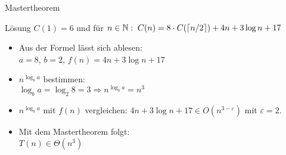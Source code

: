 \begin{frame}{Mastertheorem}
    
    \begin{block}{Lösung}
        $C(1)=6$ und für $n \in \mathbb{N} : \; C(n) = 8 \cdot C(\lceil n / 2 \rceil) + 4n + 3 \log n + 17$
        \begin{itemize}
            \item Aus der Formel lässt sich ablesen:\\
                $a=8$, $b=2$, $f(n)= 4n + 3 \log n + 17$
            \item $n^{\log_b a}$ bestimmen:\\
                $\log_b a = \log_2 8 = 3 \Rightarrow n^{\log_b a} = n^3$
            \item $n^{\log_b a}$ mit $f(n)$ vergleichen: $4n + 3 \log n + 17 \in O(n^{3-\varepsilon})$ mit $\varepsilon = 2$.
            \item Mit dem Mastertheorem folgt:\\
                $T(n) \in \Theta(n^3)$
        \end{itemize}
    \end{block}

\end{frame}